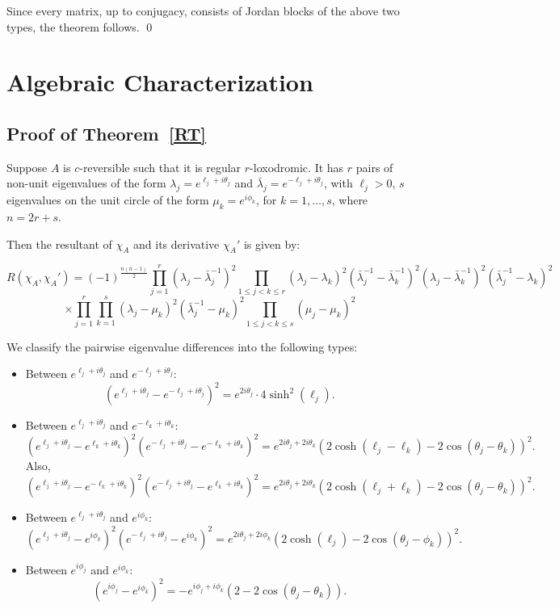 \documentclass[11pt]{amsart}
\numberwithin{equation}{section}
\theoremstyle{plain}
\theoremstyle{definition}
\newcommand{\thmref}[1]{Theorem~\ref{#1}}
\numberwithin{equation}{section}
\begin{document}
Since every matrix, up to conjugacy,  consists of Jordan blocks of the above two types, the theorem follows. 
\qed
	\section{Algebraic Characterization}\label{sec:AC}
    \subsection*{Proof of \thmref{RT}}
Suppose $A$ is $c$-reversible such that it is regular $r$-loxodromic.  It has $r$ pairs of non-unit eigenvalues of the form $\lambda_j=e^{\ell_j + i\theta_j}$ and $\bar\lambda_j=e^{-\ell_j + i\theta_j}$, with $\ell_j > 0$, $s$ eigenvalues on the unit circle of the form $\mu_k=e^{i\phi_k}$, for $k = 1, \dots, s$, where  $n = 2r + s$.

Then the resultant of \( \chi_A \) and its derivative \( \chi_A' \) is given by:

\[
R(\chi_A, \chi_A') = (-1)^{\frac{n(n-1)}{2}}
\prod_{j=1}^r (\lambda_j - \bar\lambda_j^{-1})^2
\prod_{1 \leq j < k \leq r} 
(\lambda_j - \lambda_k)^2
(\bar\lambda_j^{-1} - \bar\lambda_k^{-1})^2
(\lambda_j - \bar\lambda_k^{-1})^2
(\bar\lambda_j^{-1} - \lambda_k)^2
\]
\[
\times
\prod_{j=1}^r \prod_{k=1}^s 
(\lambda_j - \mu_k)^2
(\bar\lambda_j^{-1} - \mu_k)^2
\prod_{1 \leq j < k \leq s} 
(\mu_j - \mu_k)^2
\]

We classify the pairwise eigenvalue differences into the following types:
\begin{itemize}
    \item Between $e^{\ell_j + i\theta_j}$ and $e^{-\ell_j + i\theta_j}$:
    \[
    (e^{\ell_j + i\theta_j} - e^{-\ell_j + i\theta_j})^2 =e^{2i\theta_j} \cdot 4\sinh^2(\ell_j).
    \]
    \item Between  $e^{\ell_j + i\theta_j}$ and $e^{-\ell_k + i\theta_k}$:
    \[
    (e^{\ell_j + i\theta_j} - e^{\ell_k + i\theta_k})^2(e^{-\ell_j + i\theta_j} - e^{-\ell_k + i\theta_k})^2 = e^{2i\theta_j+2i\theta_k}(2\cosh(\ell_j-\ell_k)-2\cos(\theta_j-\theta_k))^2 .
    \]
    Also,
     \[
    (e^{\ell_j + i\theta_j} - e^{-\ell_k + i\theta_k})^2(e^{-\ell_j + i\theta_j} - e^{\ell_k + i\theta_k})^2 = e^{2i\theta_j+2i\theta_k}(2\cosh(\ell_j+\ell_k)-2\cos(\theta_j-\theta_k))^2 .
    \]
    
    \item Between $e^{\ell_j + i\theta_j}$ and $e^{i\phi_k}$:
    \[
    (e^{\ell_j + i\theta_j} - e^{i\phi_k})^2(e^{-\ell_j + i\theta_j} - e^{i\phi_k})^2 = e^{2i\theta_j+2i\phi_k}(2\cosh(\ell_j)-2\cos(\theta_j-\phi_k))^2.
    \]
    \item Between  $e^{i\phi_j}$ and $e^{i\phi_k}$:
    \[
    (e^{i\phi_j} - e^{i\phi_{k}})^2 = -e^{i\phi_j+i\phi_k}(2-2\cos(\theta_j-\theta_k)).
    \]
\end{itemize}
\end{document}
